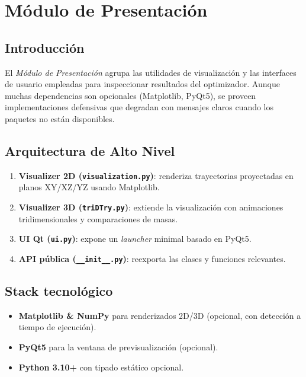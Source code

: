 
\section{Módulo de Presentación}%
\label{sec:modulo-presentacion}

\subsection{Introducción}
El \emph{Módulo de Presentación} agrupa las utilidades de visualización y las interfaces de usuario empleadas para inspeccionar resultados del optimizador. Aunque muchas dependencias son opcionales (Matplotlib, PyQt5), se proveen implementaciones defensivas que degradan con mensajes claros cuando los paquetes no están disponibles.

\subsection{Arquitectura de Alto Nivel}
\begin{enumerate}
    \item \textbf{Visualizer 2D (\texttt{visualization.py})}: renderiza trayectorias proyectadas en planos XY/XZ/YZ usando Matplotlib.
    \item \textbf{Visualizer 3D (\texttt{triDTry.py})}: extiende la visualización con animaciones tridimensionales y comparaciones de masas.
    \item \textbf{UI Qt (\texttt{ui.py})}: expone un \emph{launcher} minimal basado en PyQt5.
    \item \textbf{API pública (\texttt{\_\_init\_\_.py})}: reexporta las clases y funciones relevantes.
\end{enumerate}

\subsection{Stack tecnológico}
\begin{itemize}
    \item \textbf{Matplotlib \& NumPy} para renderizados 2D/3D (opcional, con detección a tiempo de ejecución).
    \item \textbf{PyQt5} para la ventana de previsualización (opcional).
    \item \textbf{Python 3.10+} con tipado estático opcional.
\end{itemize}


